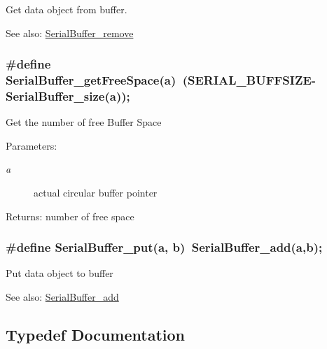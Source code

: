 Get data object from buffer. \begin{Desc}
\item[See also:]\hyperlink{group__serialbuffer_g71d90db4bcb16a30c48d68c8ec1d2df2}{SerialBuffer\_\-remove} \end{Desc}
\hypertarget{group__serialbuffer_ge32a6db48ef3832f49f6551fcdfa19d9}{
\subsubsection[{SerialBuffer\_\-getFreeSpace}]{\setlength{\rightskip}{0pt plus 5cm}\#define SerialBuffer\_\-getFreeSpace(a)~(SERIAL\_\-BUFFSIZE-SerialBuffer\_\-size(a));}}
\label{group__serialbuffer_ge32a6db48ef3832f49f6551fcdfa19d9}


Get the number of free Buffer Space \begin{Desc}
\item[Parameters:]
\begin{description}
\item[{\em a}]actual circular buffer pointer \end{description}
\end{Desc}
\begin{Desc}
\item[Returns:]number of free space \end{Desc}
\hypertarget{group__serialbuffer_g8c36b7f3380a02dc72bd23604acb63c5}{
\subsubsection[{SerialBuffer\_\-put}]{\setlength{\rightskip}{0pt plus 5cm}\#define SerialBuffer\_\-put(a, \/  b)~SerialBuffer\_\-add(a,b);}}
\label{group__serialbuffer_g8c36b7f3380a02dc72bd23604acb63c5}


Put data object to buffer \begin{Desc}
\item[See also:]\hyperlink{group__serialbuffer_g2b16eeee32d0ed95d1beb03252b10933}{SerialBuffer\_\-add} \end{Desc}


\subsection{Typedef Documentation}
\hypertarget{group__serialbuffer_g034c66ab1e1a09145312b106c2300a8b}{
\subsubsection[{buffertype}]{}}
\label{group__serialbuffer_g034c66ab1e1a09145312b106c2300a8b}


